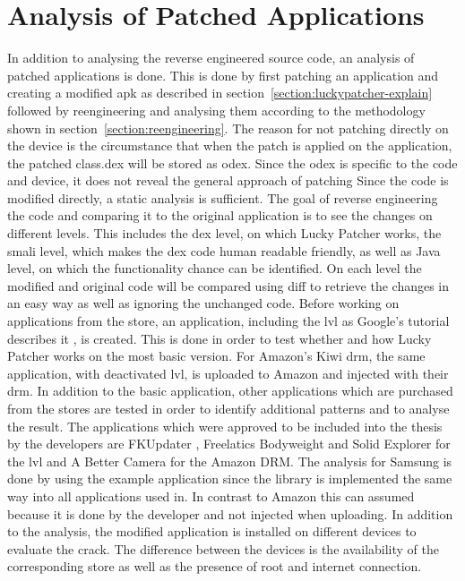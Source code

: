 \section{Analysis of Patched Applications} \label{section:luckypatcher-operation}
In addition to analysing the reverse engineered source code, an analysis of patched applications is done.
This is done by first patching an application and creating a modified apk as described in section~\ref{section:luckypatcher-explain} followed by reengineering and analysing them according to the methodology shown in section~\ref{section:reengineering}.
The reason for not patching directly on the device is the circumstance that when the patch is applied on the application, the patched class.dex will be stored as odex.
Since the odex is specific to the code and device, it does not reveal the general approach of patching
Since the code is modified directly, a static analysis is sufficient.
\newline
The goal of reverse engineering the code and comparing it to the original application is to see the changes on different levels.
This includes the \gls{dex} level, on which Lucky Patcher works, the smali level, which makes the \gls{dex} code human readable friendly, as well as Java level, on which the functionality chance can be identified.
On each level the modified and original code will be compared using diff to retrieve the changes in an easy way as well as ignoring the unchanged code.
\newline
Before working on applications from the store, an application, including the \gls{lvl} as Google's tutorial describes it \cite{developersLicensingAdding}, is created.
This is done in order to test whether and how Lucky Patcher works on the most basic version.
For Amazon's Kiwi \gls{drm}, the same application, with deactivated \gls{lvl}, is uploaded to Amazon and injected with their \gls{drm}.
In addition to the basic application, other applications which are purchased from the stores are tested in order to identify additional patterns and to analyse the result.
The applications which were approved to be included into the thesis by the developers are FKUpdater \cite{fkupdater}, Freelatics Bodyweight \cite{freelatics} and Solid Explorer \cite{solidexporer} for the \gls{lvl} and A Better Camera \cite{abettercamera} for the Amazon DRM.
The analysis for Samsung is done by using the example application since the library is implemented the same way into all applications used in.
In contrast to Amazon this can assumed because it is done by the developer and not injected when uploading.
\newline
In addition to the analysis, the modified application is installed on different devices to evaluate the crack.
The difference between the devices is the availability of the corresponding store as well as the presence of root and internet connection.
\newline

